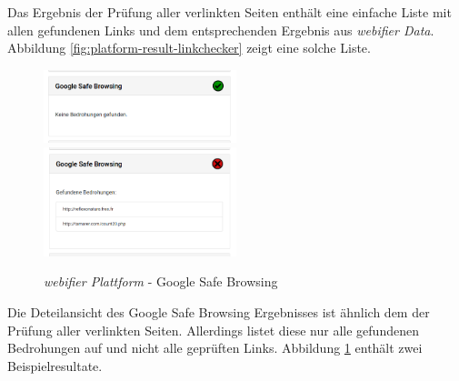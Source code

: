 Das Ergebnis der Prüfung aller verlinkten Seiten enthält eine einfache Liste mit allen gefundenen
Links und dem entsprechenden Ergebnis aus \textit{webifier Data}. Abbildung
\ref{fig:platform-result-linkchecker} zeigt eine solche Liste.

\begin{figure}[H]
\centerline{%
\includegraphics[width=0.5\textwidth]{images/platform/google-safe-browsing-clean}%
\includegraphics[width=0.5\textwidth]{images/platform/google-safe-browsing-malicious}%
}%
\caption{\textit{webifier Plattform} - Google Safe Browsing}
\label{fig:platform-result-google-safe-browsing}
\end{figure}

Die Deteilansicht des Google Safe Browsing Ergebnisses ist ähnlich dem der Prüfung aller verlinkten Seiten. Allerdings listet diese nur alle gefundenen Bedrohungen auf und nicht alle geprüften Links. Abbildung \ref{fig:platform-result-google-safe-browsing} enthält zwei Beispielresultate.


